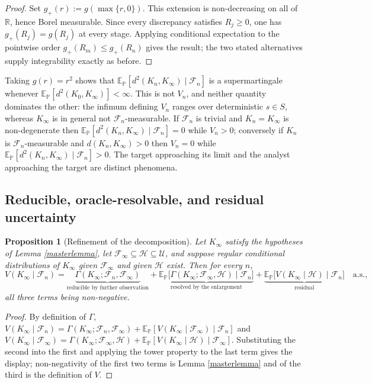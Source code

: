 \documentclass{article}
\newcommand{\E}{\mathbb{E}_{\mathbb{P}}}
\newcommand{\F}{\mathcal{F}}
\newcommand{\U}{\mathcal{U}}
\newcommand{\1}{\mathbbm{1}}
\newtheorem{prop}{Proposition}
\begin{document}
\begin{proof}
Set $g_+(r):=g(\max\{r,0\})$. This extension is non-decreasing on all of
$\mathbb R$, hence Borel measurable. Since every discrepancy satisfies
$R_j\ge0$, one has $g_+(R_j)=g(R_j)$ at every stage. Applying conditional
expectation to the pointwise order $g_+(R_m)\le g_+(R_n)$ gives the result;
the two stated alternatives supply integrability exactly as before.
\end{proof}

Taking $g(r)=r^2$ shows that $\E[d^2(K_n,K_\infty)\mid\F_n]$ is a supermartingale whenever
$\E[d^2(K_0,K_\infty)]<\infty$. This is not $V_n$, and neither quantity dominates the other: the
infimum defining $V_n$ ranges over deterministic $s\in S$, whereas $K_\infty$ is in general not
$\F_n$-measurable. If $\F_n$ is trivial and $K_n=K_\infty$ is non-degenerate then
$\E[d^2(K_n,K_\infty)\mid\F_n]=0$ while $V_n>0$; conversely if $K_n$ is $\F_n$-measurable and
$d(K_n,K_\infty)>0$ then $V_n=0$ while $\E[d^2(K_n,K_\infty)\mid\F_n]>0$. The target approaching its
limit and the analyst approaching the target are distinct phenomena.

\subsection*{Reducible, oracle-resolvable, and residual uncertainty}

\begin{prop}[Refinement of the decomposition]
\label{threeway}
Let $K_\infty$ satisfy the hypotheses of Lemma \ref{masterlemma}, let
$\F_\infty\subseteq\mathcal{H}\subseteq\U$, and suppose regular conditional distributions of
$K_\infty$ given $\F_\infty$ and given $\mathcal{H}$ exist. Then for every $n$,
\[
V(K_\infty\mid\F_n)
=\underbrace{\Gamma(K_\infty;\F_n,\F_\infty)}_{\text{reducible by further observation}}
+\underbrace{\E\big[\Gamma(K_\infty;\F_\infty,\mathcal{H})\mid\F_n\big]}_{\text{resolved by the enlargement}}
+\underbrace{\E\big[V(K_\infty\mid\mathcal{H})\mid\F_n\big]}_{\text{residual}}
\quad\text{a.s.},
\]
all three terms being non-negative.
\end{prop}

\begin{proof}
By definition of $\Gamma$,
$V(K_\infty\mid\F_n)=\Gamma(K_\infty;\F_n,\F_\infty)+\E[V(K_\infty\mid\F_\infty)\mid\F_n]$ and
$V(K_\infty\mid\F_\infty)=\Gamma(K_\infty;\F_\infty,\mathcal{H})+\E[V(K_\infty\mid\mathcal{H})\mid\F_\infty]$.
Substituting the second into the first and applying the tower property to the last term gives the
display; non-negativity of the first two terms is Lemma \ref{masterlemma} and of the third is the
definition of $V$.
\end{proof}
\end{document}
